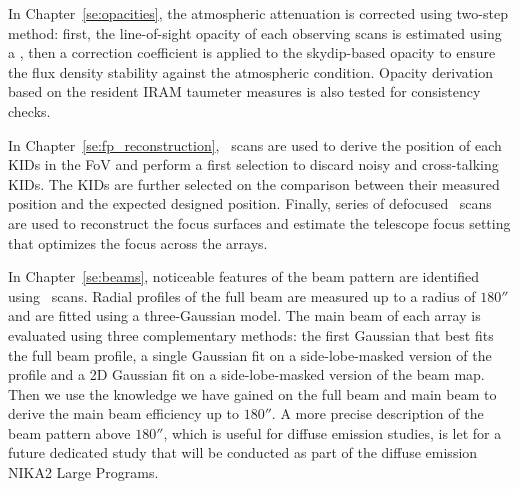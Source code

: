 In Chapter~\ref{se:opacities}, the atmospheric attenuation is corrected
using two-step method: first, the line-of-sight opacity of each
observing scans is estimated using a , then a correction coefficient is
applied to the skydip-based opacity to ensure the flux density stability
against the atmospheric condition. Opacity derivation based on the
resident IRAM taumeter measures is also tested for consistency checks.

In Chapter~\ref{se:fp_reconstruction}, \bm\ scans are used to derive
the position of each KIDs in the FoV and perform a first selection to
discard noisy and cross-talking KIDs. The KIDs are further selected on
the comparison between their measured position and the expected
designed position. Finally, series of defocused \bm\ scans are used to
reconstruct the focus surfaces and estimate the telescope focus
setting that optimizes the focus across the arrays.   

In Chapter~\ref{se:beams}, noticeable features of the beam pattern are
identified using \bm\ scans. Radial profiles of the full beam are
measured up to a radius of $180''$ and are fitted using a
three-Gaussian model. The main beam of each array is evaluated using
three complementary methods: the first Gaussian that best fits the full
beam profile, a single Gaussian fit on a side-lobe-masked version of
the profile and a 2D Gaussian fit on a side-lobe-masked version of the
beam map. Then we use the knowledge we have gained on the full beam
and main beam to derive the main beam efficiency up to $180''$. A more
precise description of the beam pattern above $180''$, which is useful for
diffuse emission studies, is let for a future dedicated study that
will be conducted as part of the diffuse emission NIKA2 Large
Programs.

